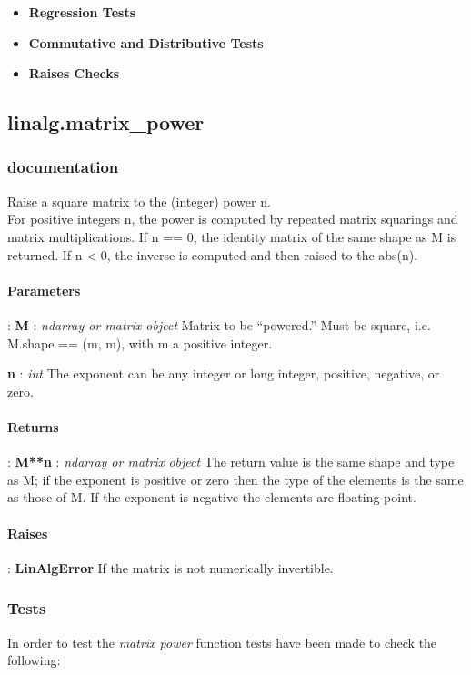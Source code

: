 \documentclass[a4paper,11pt]{article}
\begin{document}
\begin{itemize}
	\item \textbf{Regression Tests}
	\item \textbf{Commutative and Distributive Tests}
	\item \textbf{Raises Checks}
\end{itemize}


\subsection{linalg.matrix\_power}
\subsubsection{documentation}
Raise a square matrix to the (integer) power n.\\ For positive integers n, the power is computed by repeated matrix squarings and matrix multiplications. If n == 0, the identity matrix of the same shape as M is returned. If n < 0, the inverse is computed and then raised to the abs(n).


\paragraph{Parameters}: \textbf{M} : \textit{ndarray or matrix object} Matrix to be “powered.” Must be square, i.e. M.shape == (m, m), with m a positive integer.

\textbf{n} : \textit{int} The exponent can be any integer or long integer, positive, negative, or zero.

\paragraph{Returns}: \textbf{M**n} : \textit{ndarray or matrix object} The return value is the same shape and type as M; if the exponent is positive or zero then the type of the elements is the same as those of M. If the exponent is negative the elements are floating-point.

\paragraph{Raises}:	\textbf{LinAlgError} If the matrix is not numerically invertible.

\subsubsection{Tests}
In order to test the \textit{matrix power} function tests have been made to check the following:
\end{document}
